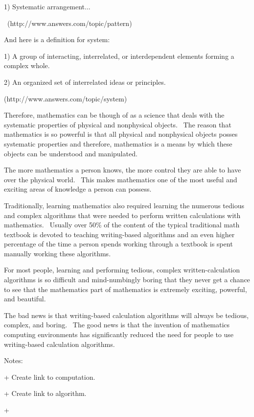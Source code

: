 \documentclass[12pt,twoside]{book}
\begin{document}
\bigskip

1) Systematic arrangement...

\ (http://www.answers.com/topic/pattern)


\bigskip

And here is a definition for system:


\bigskip

1) A group of interacting, interrelated, or interdependent elements
forming a complex whole.


\bigskip

2) An organized set of interrelated ideas or principles.

(http://www.answers.com/topic/system)


\bigskip

Therefore, mathematics can be though of as a science that deals with the systematic properties of physical and nonphysical objects. \ The reason that mathematics is so powerful is that all physical and nonphysical objects posses systematic properties and therefore, mathematics is a means by which these objects can be understood and manipulated. 

\bigskip

The more mathematics a person knows, the more control they are able to have over the physical world. \ This makes mathematics one of the most useful and exciting areas of knowledge a person can possess. 

\bigskip

Traditionally, learning mathematics also required learning the numerous tedious and complex algorithms that were needed to perform written calculations with mathematics. \ Usually over 50\% of the content of the typical traditional math textbook is devoted to teaching writing{}-based algorithms and an even higher percentage of the time a person spends working through a textbook is spent manually working these algorithms. 

\bigskip

For most people, learning and performing tedious, complex written{}-calculation algorithms is so difficult and mind{}-numbingly boring that they never get a chance to see that the {\textquotedbl}mathematics{\textquotedbl} part of mathematics is extremely exciting, powerful, and beautiful. 

\bigskip

The bad news is that writing{}-based calculation algorithms will always be tedious, complex, and boring. \ The good news is that the invention of mathematics computing environments has significantly reduced the need for people to use writing{}-based calculation algorithms. 

\bigskip


\bigskip

Notes:


\bigskip

+ Create link to {\textquotedbl}computation{\textquotedbl}.

+ Create link to {\textquotedbl}algorithm{\textquotedbl}.

+

\backmatter
\end{document}
